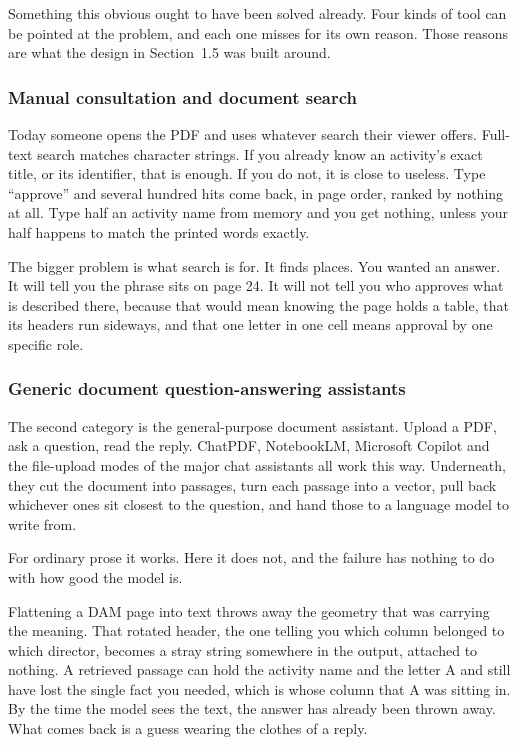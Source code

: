 Something this obvious ought to have been solved already. Four kinds of tool can
be pointed at the problem, and each one misses for its own reason. Those reasons
are what the design in Section~1.5 was built around.

\subsubsection{Manual consultation and document search}

Today someone opens the PDF and uses whatever search their viewer offers.
Full-text search matches character strings. If you already know an activity's
exact title, or its identifier, that is enough. If you do not, it is close to
useless. Type ``approve'' and several hundred hits come back, in page order,
ranked by nothing at all. Type half an activity name from memory and you get
nothing, unless your half happens to match the printed words exactly.

The bigger problem is what search is for. It finds places. You wanted an answer.
It will tell you the phrase sits on page 24. It will not tell you who approves
what is described there, because that would mean knowing the page holds a table,
that its headers run sideways, and that one letter in one cell means approval by
one specific role.

\subsubsection{Generic document question-answering assistants}

The second category is the general-purpose document assistant. Upload a PDF, ask
a question, read the reply. ChatPDF, NotebookLM, Microsoft Copilot and the
file-upload modes of the major chat assistants all work this way. Underneath,
they cut the document into passages, turn each passage into a vector, pull back
whichever ones sit closest to the question, and hand those to a language model
to write from.

For ordinary prose it works. Here it does not, and the failure has nothing to do
with how good the model is.

Flattening a DAM page into text throws away the geometry that was carrying the
meaning. That rotated header, the one telling you which column belonged to which
director, becomes a stray string somewhere in the output, attached to nothing. A
retrieved passage can hold the activity name and the letter A and still have
lost the single fact you needed, which is whose column that A was sitting in. By
the time the model sees the text, the answer has already been thrown away. What
comes back is a guess wearing the clothes of a reply.
